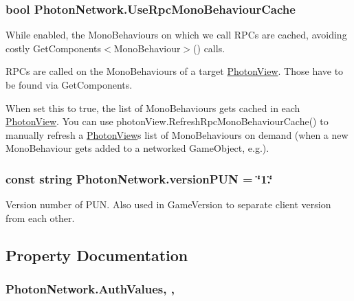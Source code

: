 \subsubsection[{\texorpdfstring{Use\+Rpc\+Mono\+Behaviour\+Cache}{UseRpcMonoBehaviourCache}}]{\setlength{\rightskip}{0pt plus 5cm}bool Photon\+Network.\+Use\+Rpc\+Mono\+Behaviour\+Cache\hspace{0.3cm}{\ttfamily [static]}}\hypertarget{class_photon_network_a2ea887525d418e088bf99d303673d2f3}{}\label{class_photon_network_a2ea887525d418e088bf99d303673d2f3}


While enabled, the Mono\+Behaviours on which we call R\+P\+Cs are cached, avoiding costly Get\+Components$<$\+Mono\+Behaviour$>$() calls. 

R\+P\+Cs are called on the Mono\+Behaviours of a target \hyperlink{class_photon_view}{Photon\+View}. Those have to be found via Get\+Components.

When set this to true, the list of Mono\+Behaviours gets cached in each \hyperlink{class_photon_view}{Photon\+View}. You can use photon\+View.\+Refresh\+Rpc\+Mono\+Behaviour\+Cache() to manually refresh a \hyperlink{class_photon_view}{Photon\+View}\textquotesingle{}s list of Mono\+Behaviours on demand (when a new Mono\+Behaviour gets added to a networked Game\+Object, e.\+g.). 
\subsubsection[{\texorpdfstring{version\+P\+UN}{versionPUN}}]{\setlength{\rightskip}{0pt plus 5cm}const string Photon\+Network.\+version\+P\+UN = \char`\"{}1.\char`\"{}}\hypertarget{class_photon_network_ac6b98cecd29a9ced8ec4a6ae78908dfc}{}\label{class_photon_network_ac6b98cecd29a9ced8ec4a6ae78908dfc}


Version number of P\+UN. Also used in Game\+Version to separate client version from each other.



\subsection{Property Documentation}
\subsubsection[{\texorpdfstring{Auth\+Values}{AuthValues}}]{ Photon\+Network.\+Auth\+Values\hspace{0.3cm}{\ttfamily [static]}, {\ttfamily [get]}, {\ttfamily [set]}}\hypertarget{class_photon_network_a282677f512ce2f53e4a0893d4e3844b8}{}\label{class_photon_network_a282677f512ce2f53e4a0893d4e3844b8}


